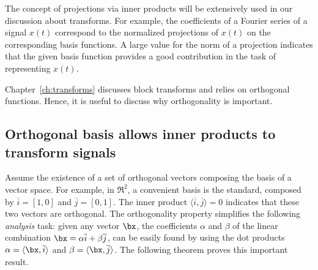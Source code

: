 
The concept of projections via inner products will be extensively used in our discussion about transforms. For example, the coefficients of a Fourier series of a signal $x(t)$ correspond to the normalized projections of $x(t)$ on the corresponding basis functions. A large value for the norm of a projection indicates that the given basis function provides a good contribution in the task of representing $x(t)$. 


Chapter~\ref{ch:transforms} discusses block transforms and relies on orthogonal functions. Hence, it is useful to  discuss why orthogonality is important.

\subsection{Orthogonal basis allows inner products to transform signals}
\label{sec:orthogonalBasis}

Assume the existence of a set of orthogonal vectors composing the basis of a vector space. For example, in $\Re^2$, a convenient basis is the standard, composed by $\overline i=[1, 0]$ and $\overline j=[0, 1]$. The inner product $\langle\overline i , \overline j\rangle=0$ indicates that these two vectors are orthogonal. The orthogonality property simplifies the following \emph{analysis} task: given any vector $\bx$, the coefficients $\alpha$ and $\beta$ of the linear combination $\bx = \alpha \overline i + \beta \overline j$, can be easily found by using the dot products $\alpha = \langle\bx, \overline i\rangle$ and  $\beta = \langle\bx, \overline j\rangle$. The following theorem proves this important result.

